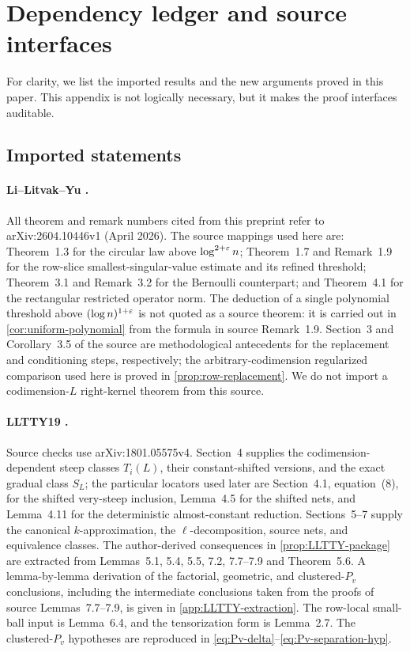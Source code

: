 \section{Dependency ledger and source interfaces}\label{app:dependencies}

For clarity, we list the imported results and the new arguments proved in this paper. This appendix is not logically necessary, but it makes the proof interfaces auditable.

\subsection{Imported statements}

\paragraph{Li--Litvak--Yu \cite{LLY26a}.}
All theorem and remark numbers cited from this preprint refer to arXiv:2604.10446v1 (April 2026). The source mappings used here are: Theorem~1.3 for the circular law above $\log^{2+\varepsilon}n$; Theorem~1.7 and Remark~1.9 for the row-slice smallest-singular-value estimate and its refined threshold; Theorem~3.1 and Remark~3.2 for the Bernoulli counterpart; and Theorem~4.1 for the rectangular restricted operator norm. The deduction of a single polynomial threshold above $(\log n)^{1+\varepsilon}$ is not quoted as a source theorem: it is carried out in \cref{cor:uniform-polynomial} from the formula in source Remark~1.9. Section~3 and Corollary~3.5 of the source are methodological antecedents for the replacement and conditioning steps, respectively; the arbitrary-codimension regularized comparison used here is proved in \cref{prop:row-replacement}. We do not import a codimension-$L$ right-kernel theorem from this source.

\paragraph{LLTTY19 \cite{LLTTY19}.}
Source checks use arXiv:1801.05575v4. Section~4 supplies the codimension-dependent steep classes $T_i(L)$, their constant-shifted versions, and the exact gradual class $S_L$; the particular locators used later are Section~4.1, equation~(8), for the shifted very-steep inclusion, Lemma~4.5 for the shifted nets, and Lemma~4.11 for the deterministic almost-constant reduction. Sections~5--7 supply the canonical $k$-approximation, the $\ell$-decomposition, source nets, and equivalence classes. The author-derived consequences in \cref{prop:LLTTY-package} are extracted from Lemmas~5.1, 5.4, 5.5, 7.2, 7.7--7.9 and Theorem~5.6. A lemma-by-lemma derivation of the factorial, geometric, and clustered-$P_v$ conclusions, including the intermediate conclusions taken from the proofs of source Lemmas~7.7--7.9, is given in \cref{app:LLTTY-extraction}. The row-local small-ball input is Lemma~6.4, and the tensorization form is Lemma~2.7. The clustered-$P_v$ hypotheses are reproduced in \eqref{eq:Pv-delta}--\eqref{eq:Pv-separation-hyp}.

